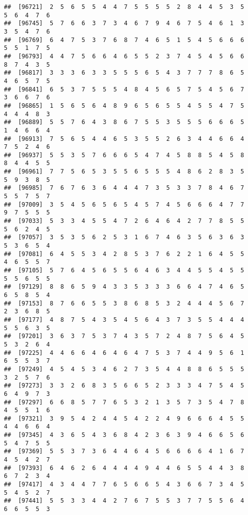 \documentclass[
]{book}
\begin{document}
\begin{verbatim}
##  [96721]  2  5  6  5  5  4  4  7  5  5  5  5  2  8  4  4  5  3  5  5  6  4  7  6
##  [96745]  5  7  6  6  3  7  3  4  6  7  9  4  6  7  5  4  6  1  3  3  5  4  7  6
##  [96769]  6  4  7  5  3  7  6  8  7  4  6  5  1  5  4  5  6  6  6  5  5  1  7  5
##  [96793]  4  4  7  5  6  6  4  6  5  5  2  3  7  4  5  4  5  6  6  8  7  4  3  5
##  [96817]  3  3  3  6  3  3  5  5  5  6  5  4  3  7  7  7  8  6  5  4  6  5  7  5
##  [96841]  6  5  3  7  5  5  5  4  8  4  5  6  5  7  5  4  5  6  7  3  6  6  7  6
##  [96865]  1  5  6  5  6  4  8  9  6  5  6  5  5  4  5  5  4  7  5  4  4  4  8  3
##  [96889]  5  5  7  6  4  3  8  6  7  5  5  3  5  5  5  6  6  6  5  1  4  6  6  4
##  [96913]  7  5  6  5  4  4  6  5  3  5  5  2  6  3  4  4  6  6  4  7  5  2  4  6
##  [96937]  5  5  3  5  7  6  6  6  5  4  7  4  5  8  8  5  4  5  8  8  4  4  5  5
##  [96961]  7  7  5  6  5  3  5  5  6  5  5  5  4  8  6  2  8  3  5  5  9  3  8  5
##  [96985]  7  6  7  6  3  6  4  4  4  7  3  5  3  3  7  8  4  6  7  5  5  7  5  7
##  [97009]  3  5  4  5  6  5  6  5  4  5  7  4  5  6  6  6  4  7  7  9  7  5  5  5
##  [97033]  5  3  3  4  5  5  4  7  2  6  4  6  4  2  7  7  8  5  5  5  6  2  4  5
##  [97057]  3  5  3  5  6  2  5  3  1  6  7  4  6  3  5  6  3  6  3  5  3  6  5  4
##  [97081]  6  4  5  5  3  4  2  8  5  3  7  6  2  2  1  6  4  5  5  4  6  5  5  7
##  [97105]  5  7  6  4  5  6  5  5  6  4  6  3  4  4  5  5  4  5  5  5  5  6  5  5
##  [97129]  8  8  6  5  9  4  3  3  5  3  3  3  6  6  4  7  4  6  5  6  5  8  5  4
##  [97153]  8  7  6  6  5  5  3  8  6  8  5  3  2  4  4  4  5  6  7  2  3  6  8  5
##  [97177]  4  8  7  5  4  3  5  4  5  6  4  3  7  3  5  5  4  4  4  5  5  6  3  5
##  [97201]  3  6  3  7  5  3  7  4  3  5  7  2  4  8  7  5  6  4  5  5  3  2  6  4
##  [97225]  4  4  6  6  4  6  4  6  4  7  5  3  7  4  4  9  5  6  1  6  5  5  3  7
##  [97249]  4  5  4  5  3  4  6  2  7  3  5  4  4  8  8  6  5  5  5  3  2  5  7  6
##  [97273]  3  3  2  6  8  3  5  6  6  5  2  3  3  3  4  7  5  4  5  6  4  9  7  3
##  [97297]  6  6  8  5  7  7  6  5  3  2  1  3  5  7  3  5  4  7  8  4  5  5  1  6
##  [97321]  3  9  5  4  2  4  4  5  4  2  2  4  9  6  6  6  4  5  5  4  4  6  6  4
##  [97345]  4  3  6  5  4  3  6  8  4  2  3  6  3  9  4  6  6  5  6  5  4  7  5  5
##  [97369]  5  5  3  7  3  6  4  4  6  4  5  6  6  6  6  4  1  6  7  4  5  4  2  7
##  [97393]  6  4  6  2  6  4  4  4  4  9  4  4  6  5  5  4  4  3  8  6  7  2  3  4
##  [97417]  4  3  4  4  7  7  6  5  6  6  5  4  3  6  6  7  3  4  5  5  4  5  2  7
##  [97441]  5  5  3  3  4  4  2  7  6  7  5  5  3  7  7  5  5  6  4  6  6  5  5  3

\end{verbatim}
\end{document}

